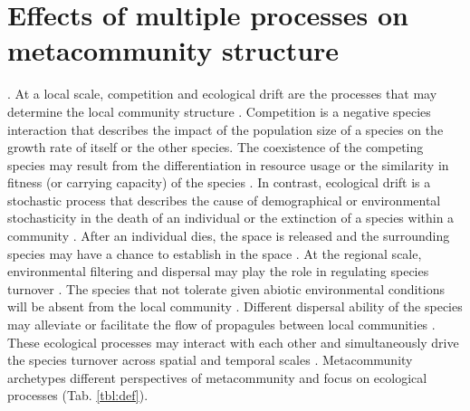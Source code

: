 \section{Effects of multiple processes on metacommunity structure}
\noindent
\DIFdelbegin {}\DIFdelend \DIFaddbegin {}\DIFaddend . At a local scale, competition and ecological drift are the processes that may determine the local community structure \citep{leibold2004metacommunity}. Competition is a negative species interaction that describes the impact of the population size of a species on the growth rate of itself or the other species. The coexistence of the competing species may result from the differentiation in resource usage or the similarity in fitness (or carrying capacity) of the species \citep{macarthur1967limiting, chesson2000mechanisms}. In contrast, ecological drift is a stochastic process that describes the cause of demographical \DIFdelbegin {}\DIFdelend or environmental stochasticity in the death of an individual or the \DIFaddbegin {}\DIFaddend extinction of a species within a \DIFdelbegin {}\DIFdelend community \citep{hubbell2011unified}. After an individual dies, the space is released and the surrounding species may have a chance to establish in the \DIFaddbegin {}\DIFaddend space \citep{fukami2015historical}. At the regional scale, environmental filtering and dispersal may play the role in regulating \DIFdelbegin {}\DIFdelend species turnover \citep{leibold2004metacommunity}. The species that \DIFdelbegin {}\DIFdelend \DIFaddbegin {}\DIFaddend not tolerate given abiotic environmental conditions will be absent from the local community \citep{kraft2015community}. Different \DIFdelbegin {}\DIFdelend dispersal ability of the species may alleviate or facilitate the flow of propagules between local communities \citep{tilman1997community, macarthur1967theory}. These ecological processes may interact with each other and simultaneously drive the species turnover across spatial and temporal scales \citep{thompson2020process}. Metacommunity archetypes \DIFdelbegin {}\DIFdelend \DIFaddbegin {}\DIFaddend different perspectives of \DIFdelbegin {}\DIFdelend \DIFaddbegin {}\DIFaddend metacommunity and focus on \DIFdelbegin {}\DIFdelend \DIFaddbegin {}\DIFaddend ecological processes \citep{leibold2004metacommunity, leibold2017metacommunity} (Tab. \ref{tbl:def}). 

